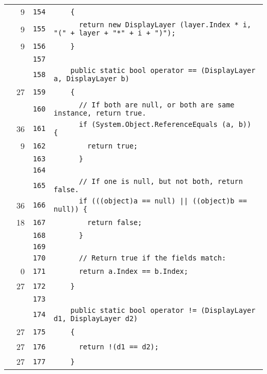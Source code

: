 \documentclass[a4paper,10pt]{article}
\begin{document}
\begin{longtable}[l]{lrrl}
\cellcolor{green} & 9 & \verb~154~ & \verb~    {~\\
\cellcolor{green} & 9 & \verb~155~ & \verb~      return new DisplayLayer (layer.Index * i, "(" + layer + "*" + i + ")");~\\
\cellcolor{green} & 9 & \verb~156~ & \verb~    }~\\
\cellcolor{gray} &  & \verb~157~ & \verb~~\\
\cellcolor{gray} &  & \verb~158~ & \verb~    public static bool operator == (DisplayLayer a, DisplayLayer b)~\\
\cellcolor{green} & 27 & \verb~159~ & \verb~    {~\\
\cellcolor{gray} &  & \verb~160~ & \verb~      // If both are null, or both are same instance, return true.~\\
\cellcolor{green} & 36 & \verb~161~ & \verb~      if (System.Object.ReferenceEquals (a, b)) {~\\
\cellcolor{green} & 9 & \verb~162~ & \verb~        return true;~\\
\cellcolor{gray} &  & \verb~163~ & \verb~      }~\\
\cellcolor{gray} &  & \verb~164~ & \verb~~\\
\cellcolor{gray} &  & \verb~165~ & \verb~      // If one is null, but not both, return false.~\\
\cellcolor{green} & 36 & \verb~166~ & \verb~      if (((object)a == null) || ((object)b == null)) {~\\
\cellcolor{green} & 18 & \verb~167~ & \verb~        return false;~\\
\cellcolor{gray} &  & \verb~168~ & \verb~      }~\\
\cellcolor{gray} &  & \verb~169~ & \verb~~\\
\cellcolor{gray} &  & \verb~170~ & \verb~      // Return true if the fields match:~\\
\cellcolor{red} & 0 & \verb~171~ & \verb~      return a.Index == b.Index;~\\
\cellcolor{green} & 27 & \verb~172~ & \verb~    }~\\
\cellcolor{gray} &  & \verb~173~ & \verb~~\\
\cellcolor{gray} &  & \verb~174~ & \verb~    public static bool operator != (DisplayLayer d1, DisplayLayer d2)~\\
\cellcolor{green} & 27 & \verb~175~ & \verb~    {~\\
\cellcolor{green} & 27 & \verb~176~ & \verb~      return !(d1 == d2);~\\
\cellcolor{green} & 27 & \verb~177~ & \verb~    }~\\

\end{longtable}
\end{document}
